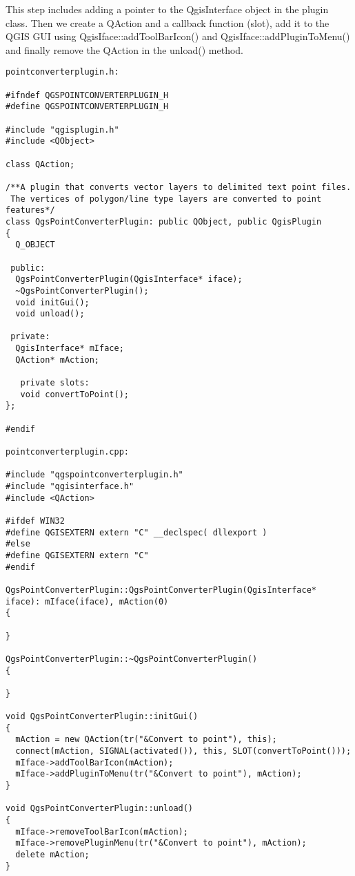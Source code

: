 
This step includes adding a pointer to the QgisInterface object in the plugin
class. Then we create a QAction and a callback function (slot), add it to the
QGIS GUI using QgisIface::addToolBarIcon() and QgisIface::addPluginToMenu()
and finally remove the QAction in the unload() method.

\begin{verbatim}
pointconverterplugin.h:

#ifndef QGSPOINTCONVERTERPLUGIN_H
#define QGSPOINTCONVERTERPLUGIN_H

#include "qgisplugin.h"
#include <QObject>

class QAction;

/**A plugin that converts vector layers to delimited text point files.
 The vertices of polygon/line type layers are converted to point features*/
class QgsPointConverterPlugin: public QObject, public QgisPlugin
{
  Q_OBJECT

 public:
  QgsPointConverterPlugin(QgisInterface* iface);
  ~QgsPointConverterPlugin();
  void initGui();
  void unload();
  
 private:
  QgisInterface* mIface;
  QAction* mAction;
  
   private slots:
   void convertToPoint();
};

#endif

pointconverterplugin.cpp:

#include "qgspointconverterplugin.h"
#include "qgisinterface.h"
#include <QAction>

#ifdef WIN32
#define QGISEXTERN extern "C" __declspec( dllexport )
#else
#define QGISEXTERN extern "C"
#endif

QgsPointConverterPlugin::QgsPointConverterPlugin(QgisInterface* iface): mIface(iface), mAction(0)
{

}

QgsPointConverterPlugin::~QgsPointConverterPlugin()
{

}

void QgsPointConverterPlugin::initGui()
{
  mAction = new QAction(tr("&Convert to point"), this);
  connect(mAction, SIGNAL(activated()), this, SLOT(convertToPoint()));
  mIface->addToolBarIcon(mAction);
  mIface->addPluginToMenu(tr("&Convert to point"), mAction);
}

void QgsPointConverterPlugin::unload()
{
  mIface->removeToolBarIcon(mAction);
  mIface->removePluginMenu(tr("&Convert to point"), mAction);
  delete mAction;
}


\end{verbatim}
